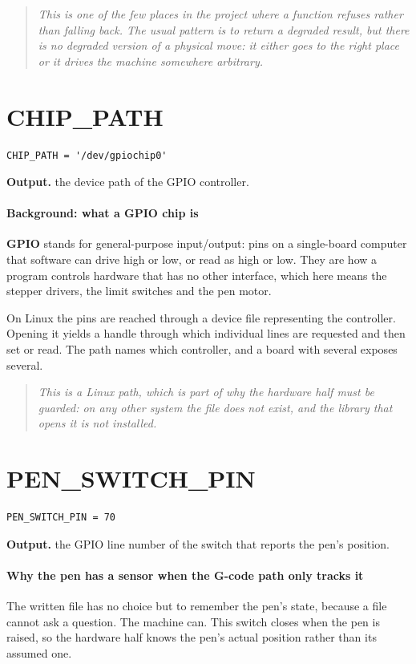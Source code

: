 \begin{quote}\small\itshape This is one of the few places in the project where a function refuses rather than falling back. The usual pattern is to return a degraded result, but there is no degraded version of a physical move: it either goes to the right place or it drives the machine somewhere arbitrary.\end{quote}

\section{CHIP\_PATH}
\begin{lstlisting}[style=sig]
CHIP_PATH = '/dev/gpiochip0'
\end{lstlisting}

\noindent\textbf{Output.} the device path of the GPIO controller.


\paragraph{Background: what a GPIO chip is}
\textbf{GPIO} stands for general-purpose input/output: pins on a single-board computer that software can drive high or low, or read as high or low. They are how a program controls hardware that has no other interface, which here means the stepper drivers, the limit switches and the pen motor.

On Linux the pins are reached through a device file representing the controller. Opening it yields a handle through which individual lines are requested and then set or read. The path names which controller, and a board with several exposes several.


\begin{quote}\small\itshape This is a Linux path, which is part of why the hardware half must be guarded: on any other system the file does not exist, and the library that opens it is not installed.\end{quote}

\section{PEN\_SWITCH\_PIN}
\begin{lstlisting}[style=sig]
PEN_SWITCH_PIN = 70
\end{lstlisting}

\noindent\textbf{Output.} the GPIO line number of the switch that reports the pen's position.


\paragraph{Why the pen has a sensor when the G-code path only tracks it}
The written file has no choice but to remember the pen's state, because a file cannot ask a question. The machine can. This switch closes when the pen is raised, so the hardware half knows the pen's actual position rather than its assumed one.

